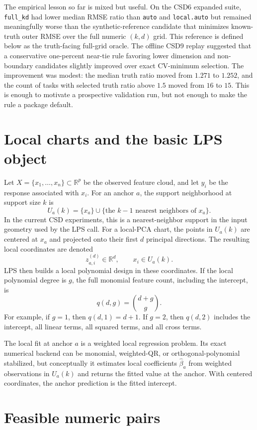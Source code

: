 \documentclass[11pt]{article}
\newcommand{\R}{\mathbb{R}}
\newcommand{\code}[1]{\texttt{#1}}
\begin{document}
The empirical lesson so far is mixed but useful.  On the CSD6 expanded suite,
\code{full\_kd} had lower median RMSE ratio than \code{auto} and \code{local.auto}
but remained meaningfully worse than the synthetic-reference candidate that
minimizes known-truth outer RMSE over the full numeric $(k,d)$ grid.  This
reference is defined below as the truth-facing full-grid oracle.  The
offline CSD9 replay suggested that a conservative one-percent near-tie rule
favoring lower dimension and non-boundary candidates slightly improved over exact
CV-minimum selection.  The improvement was modest: the median truth ratio moved
from $1.271$ to $1.252$, and the count of tasks with selected truth ratio above
$1.5$ moved from $16$ to $15$.  This is enough to motivate a prospective
validation run, but not enough to make the rule a package default.

\section{Local charts and the basic LPS object}

Let $X=\{x_1,\ldots,x_n\}\subset\R^p$ be the observed feature cloud, and let
$y_i$ be the response associated with $x_i$.  For an anchor $a$, the support
neighborhood at support size $k$ is
\[
  U_a(k)=\{x_a\}\cup\{\text{the } k-1 \text{ nearest neighbors of } x_a\}.
\]
In the current CSD experiments, this is a nearest-neighbor support in the input
geometry used by the LPS call.  For a local-PCA chart, the points in $U_a(k)$ are
centered at $x_a$ and projected onto their first $d$ principal directions.  The
resulting local coordinates are denoted
\[
  z_{a,i}^{(d)}\in\R^d,\qquad x_i\in U_a(k).
\]
LPS then builds a local polynomial design in these coordinates.  If the local
polynomial degree is $g$, the full monomial feature count, including the
intercept, is
\[
  q(d,g)=\binom{d+g}{g}.
\]
For example, if $g=1$, then $q(d,1)=d+1$.  If $g=2$, then $q(d,2)$ includes the
intercept, all linear terms, all squared terms, and all cross terms.

The local fit at anchor $a$ is a weighted local regression problem.  Its exact
numerical backend can be monomial, weighted-QR, or orthogonal-polynomial
stabilized, but conceptually it estimates local coefficients $\widehat\beta_a$
from weighted observations in $U_a(k)$ and returns the fitted value at the anchor.
With centered coordinates, the anchor prediction is the fitted intercept.

\section{Feasible numeric pairs}
\end{document}
